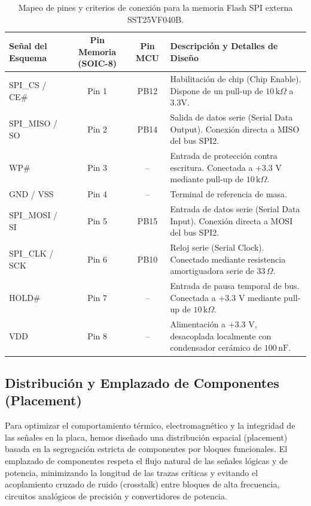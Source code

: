 \documentclass[12pt,a4paper]{article}
\begin{document}
\begin{table}[H]
\centering
\small
\begin{tabularx}{\textwidth}{|l|c|c|X|}
\hline
\textbf{Señal del Esquema} & \textbf{Pin Memoria (SOIC-8)} & \textbf{Pin MCU} & \textbf{Descripción y Detalles de Diseño} \\ \hline
SPI\_CS / CE\# & Pin 1 & PB12 & Habilitación de chip (Chip Enable). Dispone de un pull-up de $10\,\text{k}\Omega$ a 3.3V. \\ \hline
SPI\_MISO / SO & Pin 2 & PB14 & Salida de datos serie (Serial Data Output). Conexión directa a MISO del bus SPI2. \\ \hline
WP\# & Pin 3 & -- & Entrada de protección contra escritura. Conectada a +3.3 V mediante pull-up de $10\,\text{k}\Omega$. \\ \hline
GND / VSS & Pin 4 & -- & Terminal de referencia de masa. \\ \hline
SPI\_MOSI / SI & Pin 5 & PB15 & Entrada de datos serie (Serial Data Input). Conexión directa a MOSI del bus SPI2. \\ \hline
SPI\_CLK / SCK & Pin 6 & PB10 & Reloj serie (Serial Clock). Conectado mediante resistencia amortiguadora serie de $33\,\Omega$. \\ \hline
HOLD\# & Pin 7 & -- & Entrada de pausa temporal de bus. Conectada a +3.3 V mediante pull-up de $10\,\text{k}\Omega$. \\ \hline
VDD & Pin 8 & -- & Alimentación a +3.3 V, desacoplada localmente con condensador cerámico de $100\,\text{nF}$. \\ \hline
\end{tabularx}
\caption{Mapeo de pines y criterios de conexión para la memoria Flash SPI externa SST25VF040B.}
\label{tab:flash_pines}
\end{table}

\subsection{Distribución y Emplazado de Componentes (Placement)}

Para optimizar el comportamiento térmico, electromagnético y la integridad de las señales en la placa, hemos diseñado una distribución espacial (placement) basada en la segregación estricta de componentes por bloques funcionales. El emplazado de componentes respeta el flujo natural de las señales lógicas y de potencia, minimizando la longitud de las trazas críticas y evitando el acoplamiento cruzado de ruido (crosstalk) entre bloques de alta frecuencia, circuitos analógicos de precisión y convertidores de potencia.
\end{document}

